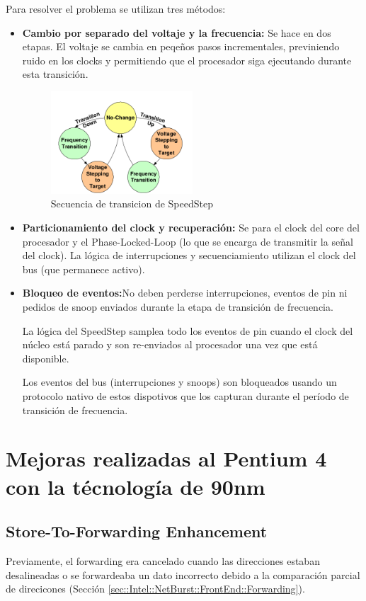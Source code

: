 Para resolver el problema se utilizan tres métodos:
\begin{itemize}
	\item \textbf{Cambio por separado del voltaje y la frecuencia:} Se hace en dos etapas. El voltaje se cambia en peqeños pasos incrementales, previniendo ruido en los clocks y permitiendo que el procesador siga ejecutando durante esta transición. 
	
	\begin{figure}[ht]
		\centering
		\includegraphics[width=0.5\textwidth]{imagenes/voltage-transitions}
		\caption{Secuencia de transicion de SpeedStep}
		\label{fig:voltageTransitions}
	\end{figure}

\item \textbf{Particionamiento del clock y recuperación:} Se para el clock del core del procesador y el Phase-Locked-Loop (lo que se encarga de transmitir la señal del clock). La lógica de interrupciones y secuenciamiento utilizan el clock del bus (que permanece activo).

\item \textbf{Bloqueo de eventos:}No deben perderse interrupciones, eventos de pin ni pedidos de snoop enviados durante la etapa de transición de frecuencia.

La lógica del SpeedStep samplea todo los eventos de pin cuando el clock del núcleo está parado y son re-enviados al procesador una vez que está disponible.

Los eventos del bus (interrupciones y snoops) son bloqueados usando un protocolo nativo de estos dispotivos que los capturan durante el período de transición de frecuencia.
\end{itemize}

\newpage
\section{Mejoras realizadas al Pentium 4 con la técnología de 90nm \cite{Boggs2004TheMO}}
\subsection{Store-To-Forwarding Enhancement}
Previamente, el forwarding era cancelado cuando las direcciones estaban desalineadas o se forwardeaba un dato incorrecto debido a la comparación parcial de direcicones (Sección \ref{sec::Intel::NetBurst::FrontEnd::Forwarding}).


